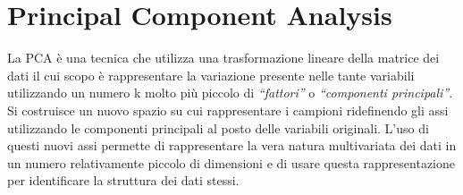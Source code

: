 \documentclass[12pt]{article}
\begin{document}
\section{Principal Component Analysis}

	La \ac{PCA} è una tecnica che utilizza una trasformazione lineare della matrice dei dati il cui scopo è rappresentare la variazione presente nelle tante variabili utilizzando un numero k molto più piccolo di \emph{“fattori”} o \emph{“componenti principali”}. Si costruisce un nuovo spazio su cui rappresentare i campioni ridefinendo gli assi utilizzando le componenti principali al posto delle variabili originali. L’uso di questi nuovi assi permette di rappresentare la vera natura multivariata dei dati in un numero relativamente piccolo di dimensioni e di usare questa rappresentazione per identificare la struttura dei dati stessi\cite{anderson2003introduction}\cite{mardia1979multivariate}.  
	
\end{document}
